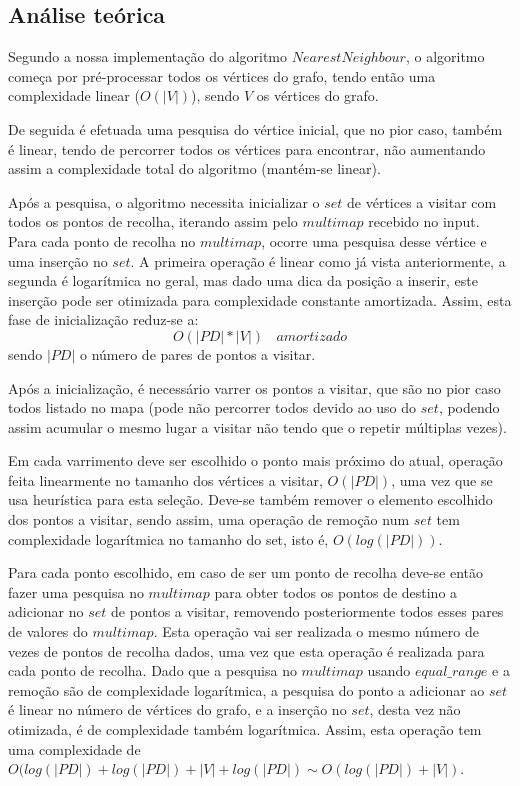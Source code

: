 \documentclass[article, a4paper, 12pt, oneside]{memoir}
\begin{document}
\subsection{Análise teórica}
Segundo a nossa implementação do algoritmo $NearestNeighbour$, o algoritmo começa por pré-processar todos os vértices do grafo, tendo então uma complexidade linear ($O(|V|)$), sendo $V$ os vértices do grafo.

De seguida é efetuada uma pesquisa do vértice inicial, que no pior caso, também é linear, tendo de percorrer todos os vértices para encontrar, não aumentando assim a complexidade total do algoritmo (mantém-se linear).

Após a pesquisa, o algoritmo necessita inicializar o $set$ de vértices a visitar com todos os pontos de recolha, iterando assim pelo $multimap$ recebido no input. Para cada ponto de recolha no $multimap$, ocorre uma pesquisa desse vértice e uma inserção no $set$. A primeira operação é linear como já vista anteriormente, a segunda é logarítmica no geral, mas dado uma dica da posição a inserir, este inserção pode ser otimizada para complexidade constante amortizada. Assim, esta fase de inicialização reduz-se a:
\begin{equation}
O(|PD| * |V|)~~~~ amortizado
\end{equation}
sendo $|PD|$ o número de pares de pontos a visitar.

Após a inicialização, é necessário varrer os pontos a visitar, que são no pior caso todos listado no mapa (pode não percorrer todos devido ao uso do $set$, podendo assim acumular o mesmo lugar a visitar não tendo que o repetir múltiplas vezes).

Em cada varrimento deve ser escolhido o ponto mais próximo do atual, operação feita linearmente no tamanho dos vértices a visitar, $O(|PD|)$, uma vez que se usa heurística para esta seleção.
Deve-se também remover o elemento escolhido dos pontos a visitar, sendo assim, uma operação de remoção num $set$ tem complexidade logarítmica no tamanho do set, isto é, $O(log(|PD|))$.

Para cada ponto escolhido, em caso de ser um ponto de recolha deve-se então fazer uma pesquisa no $multimap$ para obter todos os pontos de destino a adicionar no $set$ de pontos a visitar, removendo posteriormente todos esses pares de valores do $multimap$. Esta operação vai ser realizada o mesmo número de vezes de pontos de recolha dados, uma vez que esta operação é realizada para cada ponto de recolha. Dado que a pesquisa no $multimap$ usando $equal\_range$ e a remoção são de complexidade logarítmica, a pesquisa do ponto a adicionar ao $set$ é linear no número de vértices do grafo, e a inserção no $set$, desta vez não otimizada, é de complexidade também logarítmica. Assim, esta operação tem uma complexidade de $O(log(|PD|) + log(|PD|)+|V|+log(|PD|) \sim O(log(|PD|)+|V|)$.
\end{document}
